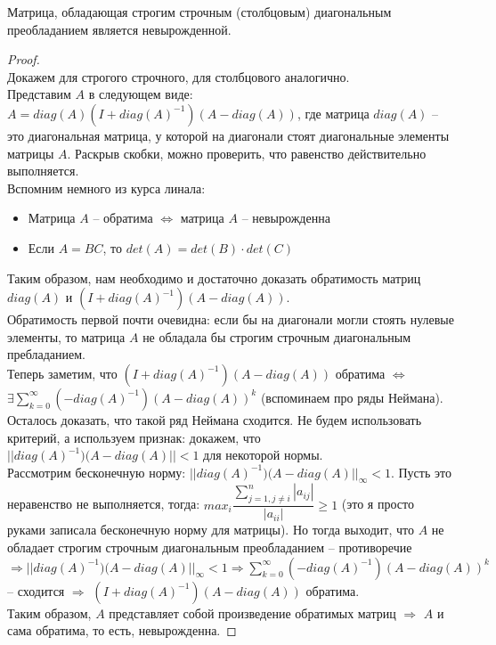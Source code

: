 \begin{theorem*}
    Матрица, обладающая строгим строчным (столбцовым) диагональным
    преобладанием является невырожденной.
\end{theorem*}
\begin{proof} \ \\
    Докажем для строгого строчного, для столбцового аналогично. \\

    Представим $A$ в следующем виде: $A = diag(A)(I + diag(A)^{-1})(A - diag(A))$,
    где матрица $diag(A)$ -- это диагональная матрица, у которой на диагонали
    стоят диагональные элементы матрицы $A$. Раскрыв скобки, можно проверить,
    что равенство действительно выполняется. \\

    Вспомним немного из курса линала:
    \begin{itemize}
        \item Матрица $A$ -- обратима $\Leftrightarrow$ матрица $A$ -- невырожденна
        \item Если $A = BC$, то $det(A) = det(B) \cdot det(C)$
    \end{itemize}

    Таким образом, нам необходимо и достаточно доказать обратимость матриц
    $diag(A)$ и $(I + diag(A)^{-1})(A - diag(A))$. \\
    
    Обратимость первой почти очевидна: если бы на диагонали могли стоять
    нулевые элементы, то матрица $A$ не обладала бы строгим строчным диагональным
    пребладанием. \\ 
    
    Теперь заметим, что $(I + diag(A)^{-1})(A - diag(A))$ обратима $\Leftrightarrow$
    $\exists \sum_{k = 0}^{\infty}(-diag(A)^{-1})(A - diag(A))^k$ (вспоминаем про ряды Неймана). \\ 

    Осталось доказать, что такой ряд Неймана сходится. Не будем использовать критерий,
    а используем признак: докажем, что $||diag(A)^{-1})(A - diag(A)|| < 1$ для некоторой нормы. \\
    
    Рассмотрим бесконечную норму: $||diag(A)^{-1})(A - diag(A)||_{\infty} < 1$. Пусть это неравенство не выполняется, тогда:
    $\displaystyle max_i \dfrac{\sum_{j = 1, j \neq i}^{n}|a_{ij}|}{|a_{ii}|} \geqslant 1$ (это я просто руками записала
    бесконечную норму для матрицы). Но тогда выходит, что $A$ не обладает строгим строчным
    диагональным преобладанием -- противоречие $\Rightarrow ||diag(A)^{-1})(A - diag(A)||_{\infty} < 1 \Rightarrow
    \sum_{k = 0}^{\infty}(-diag(A)^{-1})(A - diag(A))^k$ -- сходится $\Rightarrow$
    $(I + diag(A)^{-1})(A - diag(A))$ обратима. \\

    Таким образом, $A$ представляет собой произведение обратимых матриц $\Rightarrow$ $A$
    и сама обратима, то есть, невырожденна.
\end{proof}

